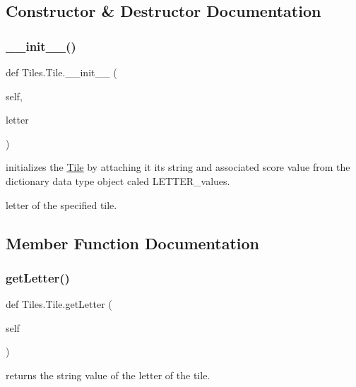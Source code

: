 \subsection{Constructor \& Destructor Documentation}
\mbox{\label{class_tiles_1_1_tile_ac0b000846904fc226a1b302d1bedd9bc}} 
\subsubsection{\texorpdfstring{\+\_\+\+\_\+init\+\_\+\+\_\+()}{\_\_init\_\_()}}
{\footnotesize\ttfamily def Tiles.\+Tile.\+\_\+\+\_\+init\+\_\+\+\_\+ (\begin{DoxyParamCaption}\item[{}]{self,  }\item[{}]{letter }\end{DoxyParamCaption})}



initializes the \hyperlink{class_tiles_1_1_tile}{Tile} by attaching it its string and associated score value from the dictionary data type object caled L\+E\+T\+T\+E\+R\+\_\+values. 

letter of the specified tile. 

\subsection{Member Function Documentation}
\mbox{\label{class_tiles_1_1_tile_a09ce9c2eaba70a0652d2136a6ca3aec2}} 
\subsubsection{\texorpdfstring{get\+Letter()}{getLetter()}}
{\footnotesize\ttfamily def Tiles.\+Tile.\+get\+Letter (\begin{DoxyParamCaption}\item[{}]{self }\end{DoxyParamCaption})}



returns the string value of the letter of the tile. 

